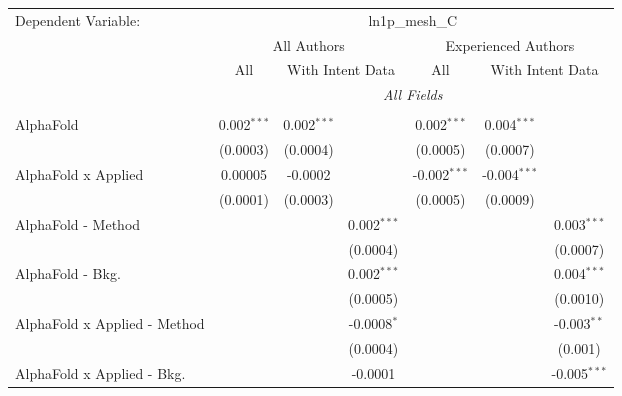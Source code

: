 \begingroup
\centering
\begin{tabular}{lcccccc}
   \tabularnewline \midrule \midrule
   Dependent Variable: & \multicolumn{6}{c}{ln1p\_mesh\_C}\\
 & \multicolumn{3}{c}{All Authors} & \multicolumn{3}{c}{Experienced Authors} \\
\cmidrule(lr){2-4} \cmidrule(lr){5-7}
 & \multicolumn{1}{c}{All} & \multicolumn{2}{c}{With Intent Data} & \multicolumn{1}{c}{All} & \multicolumn{2}{c}{With Intent Data} \\
\cmidrule(lr){2-2} \cmidrule(lr){3-4} \cmidrule(lr){5-5} \cmidrule(lr){6-7}
 & \multicolumn{6}{c}{\textit{All Fields}} \\ \\
   AlphaFold                      & 0.002$^{***}$  & 0.002$^{***}$ &               & 0.002$^{***}$  & 0.004$^{***}$  &   \\   
                                  & (0.0003)       & (0.0004)      &               & (0.0005)       & (0.0007)       &   \\   
   AlphaFold x Applied            & 0.00005        & -0.0002       &               & -0.002$^{***}$ & -0.004$^{***}$ &   \\   
                                  & (0.0001)       & (0.0003)      &               & (0.0005)       & (0.0009)       &   \\   
   AlphaFold - Method             &                &               & 0.002$^{***}$ &                &                & 0.003$^{***}$\\   
                                  &                &               & (0.0004)      &                &                & (0.0007)\\   
   AlphaFold - Bkg.               &                &               & 0.002$^{***}$ &                &                & 0.004$^{***}$\\   
                                  &                &               & (0.0005)      &                &                & (0.0010)\\   
   AlphaFold x Applied - Method   &                &               & -0.0008$^{*}$ &                &                & -0.003$^{**}$\\   
                                  &                &               & (0.0004)      &                &                & (0.001)\\   
   AlphaFold x Applied - Bkg.     &                &               & -0.0001       &                &                & -0.005$^{***}$\\   

\end{tabular}
